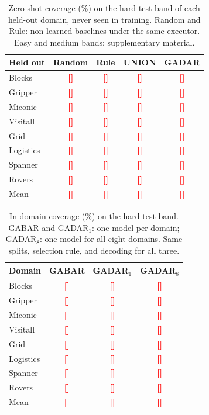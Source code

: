 \documentclass[letterpaper]{article} %
\newcommand{\gadar}{GADAR}                    %
\newcommand{\union}{UNION}                    %
\newcommand{\todonum}[1]{\textcolor{red}{\textbf{[#1]}}}
\begin{document}
\begin{table}[t]
\centering
\small
\caption{Zero-shot coverage (\%) on the hard test band of each held-out
domain, never seen in training. Random and Rule: non-learned baselines under
the same executor. Easy and medium bands: supplementary material.}
\label{table:zeroshot}
\begin{tabular}{@{}lcccc@{}}
\toprule
Held out & Random & Rule & \union{} & \gadar{} \\
\midrule
Blocks    & \todonum{} & \todonum{} & \todonum{} & \todonum{} \\
Gripper   & \todonum{} & \todonum{} & \todonum{} & \todonum{} \\
Miconic   & \todonum{} & \todonum{} & \todonum{} & \todonum{} \\
Visitall  & \todonum{} & \todonum{} & \todonum{} & \todonum{} \\
Grid      & \todonum{} & \todonum{} & \todonum{} & \todonum{} \\
Logistics & \todonum{} & \todonum{} & \todonum{} & \todonum{} \\
Spanner   & \todonum{} & \todonum{} & \todonum{} & \todonum{} \\
Rovers    & \todonum{} & \todonum{} & \todonum{} & \todonum{} \\
\midrule
Mean      & \todonum{} & \todonum{} & \todonum{} & \todonum{} \\
\bottomrule
\end{tabular}
\end{table}

\begin{table}[t]
\centering
\small
\caption{In-domain coverage (\%) on the hard test band. GABAR and
\gadar{}$_1$: one model per domain; \gadar{}$_8$: one model for all eight
domains. Same splits, selection rule, and decoding for all three.}
\label{table:indomain}
\begin{tabular}{@{}lccc@{}}
\toprule
Domain & GABAR & \gadar{}$_1$ & \gadar{}$_8$ \\
\midrule
Blocks    & \todonum{} & \todonum{} & \todonum{} \\
Gripper   & \todonum{} & \todonum{} & \todonum{} \\
Miconic   & \todonum{} & \todonum{} & \todonum{} \\
Visitall  & \todonum{} & \todonum{} & \todonum{} \\
Grid      & \todonum{} & \todonum{} & \todonum{} \\
Logistics & \todonum{} & \todonum{} & \todonum{} \\
Spanner   & \todonum{} & \todonum{} & \todonum{} \\
Rovers    & \todonum{} & \todonum{} & \todonum{} \\
\midrule
Mean      & \todonum{} & \todonum{} & \todonum{} \\
\bottomrule
\end{tabular}
\end{table}
\end{document}

